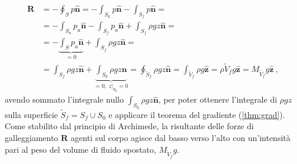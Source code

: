 \begin{equation}
\begin{aligned}
    \bm{R} & = - \oint_{S} p \bm{\hat{n}} = 
               - \int_{S_a} p \bm{\hat{n}} - \int_{S_f} p \bm{\hat{n}} = \\
        & =    - \int_{S_a} p_a \bm{\hat{n}} - \int_{S_f} p_a \bm{\hat{n}} + 
                 \int_{S_f} \rho g z \bm{\hat{n}} = \\
        & =    - \underbrace{\int_{S} p_a \bm{\hat{n}}}_{=0} + 
                 \int_{S_f} \rho g z \bm{\hat{n}} = \\
        & =      \int_{S_f} \rho g z \bm{\hat{n}} + 
                 \underbrace{\int_{S_0} \rho g z \bm{\hat{n}}}_{=0, \ z|_{S_0} = 0} =
                 \oint_{\tilde{S}_f} \rho g z \bm{\hat{n}} = 
                 \int_{\tilde{V}_f} \rho g \bm{\hat{z} } = 
                 \rho \tilde{V}_f g \bm{\hat{z}} = 
                 M_{\tilde{V}_f} g \bm{\hat{z}} \ ,
\end{aligned}
\end{equation}
avendo sommato l'integrale nullo $\int_{S_0} \rho g z \bm{\hat{n}}$, per poter ottenere l'integrale di $\rho g z$ sulla superficie $\tilde{S}_f = S_f \cup S_0$ e applicare il teorema del gradiente (\ref{thm:grad}).
Come stabilito dal principio di Archimede, la risultante delle forze di galleggiamento $\bm{R}$ agenti sul corpo agisce dal basso verso l'alto con un'intensità pari al peso del volume di fluido spostato, $M_{\tilde{V}_f} g$.

